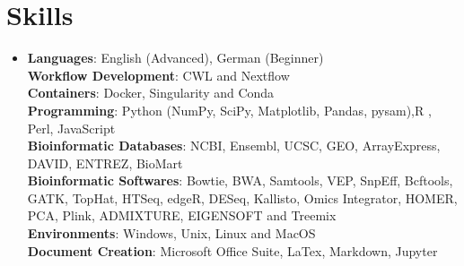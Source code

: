 \documentclass[A4,11pt]{article}
\begin{document}
\section{Skills}
 \begin{itemize}[leftmargin=0.5cm, label={}]
    \item{
     \textbf{Languages}{: English (Advanced), German (Beginner)} \\
    \textbf{Workflow Development}{: CWL and Nextflow} \\
    \textbf{Containers}{: Docker, Singularity and Conda} \\
    \textbf{Programming}{: Python (NumPy, SciPy, Matplotlib, Pandas, pysam),R , Perl, JavaScript} \\
    \textbf{Bioinformatic Databases}{: NCBI, Ensembl, UCSC, GEO, ArrayExpress, DAVID, ENTREZ, BioMart} \\
    \textbf{Bioinformatic Softwares}{: Bowtie, BWA, Samtools, VEP, SnpEff, Bcftools, GATK, TopHat, HTSeq, edgeR, DESeq, Kallisto, Omics Integrator, HOMER, PCA, Plink, ADMIXTURE, EIGENSOFT and Treemix} \\    
     \textbf{Environments}{: Windows, Unix, Linux and MacOS} \\
     \textbf{Document Creation}{: Microsoft Office Suite, LaTex, Markdown, Jupyter} \\
     
    }
 \end{itemize}
    
\end{document}
